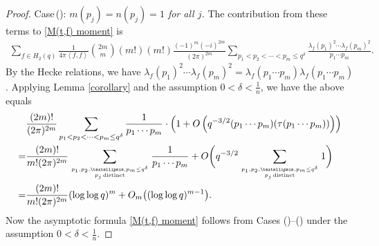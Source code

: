 \documentclass[11pt,reqno]{amsart}
\numberwithin{equation}{section}
\theoremstyle{plain}
\theoremstyle{definition}
\begin{document}
\begin{proof}
Case\,(\uppercase\expandafter{}):
\emph{$m(p_{j})=n(p_{j})=1$ for all $j$.}
The contribution from these terms to \eqref{M(t,f) moment} is
\begin{equation*}
\begin{split}
\sum_{f\in H_2(q)}\frac{1}{4\pi \left<f,f\right>}\binom{2m}{m}(m!)(m!)\frac{(-1)^m(-i)^{2m}}{(2\pi)^{2m}}
\sum_{p_1<p_2<\cdots<p_m\leq q^\delta}\frac{\lambda_f(p_1)^2\cdots\lambda_f(p_m)^2}{p_1\cdots p_m}.
\end{split}
\end{equation*}
By the Hecke relations, we have $\lambda_f(p_1)^2\cdots\lambda_f(p_m)^2=\lambda_f(p_1\cdots p_m)\lambda_f(p_1\cdots p_m)$.
Applying Lemma \ref{corollary} and the assumption $0<\delta<\frac{1}{n}$, we have the above equals
\begin{equation*}
\begin{split}
&\frac{(2m)!}{(2\pi)^{2m}}\sum_{p_1<p_2<\cdots<p_m\leq q^\delta}\frac{1}{p_1\cdots p_m}
\cdot\left(1+O\left(q^{-3/2}(p_1\cdots p_m)(\tau (p_1\cdots p_m))\right)\right)\\
=&\frac{(2m)!}{m!(2\pi)^{2m}}\sum_{p_1,p_2,\ldots,p_m\leq q^\delta\atop p_j \,\text{distinct}}\frac{1}{p_1\cdots p_m}
+O\bigg(q^{-3/2}\sum_{p_1,p_2,\ldots,p_m\leq q^\delta\atop p_j\,\text{distinct}}1\bigg)\\
=&\frac{(2m)!}{m!(2\pi)^{2m}}(\log\log q)^m
+O_m\big((\log\log q)^{m-1}\big).
\end{split}
\end{equation*}
Now the asymptotic formula \eqref{M(t,f) moment} follows from
Cases (\uppercase\expandafter{})--(\uppercase\expandafter{})
under the assumption $0<\delta<\frac{1}{n}$.


\end{proof}
\end{document}
